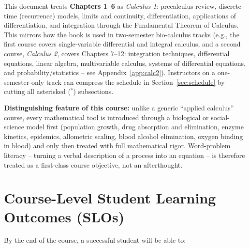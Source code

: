 \documentclass[11pt]{article}
\newcommand{\opt}{$^{\ast}$}
\begin{document}
This document treats \textbf{Chapters 1--6} as \emph{Calculus 1}: precalculus review,
discrete-time (recurrence) models, limits and continuity, differentiation, applications of
differentiation, and integration through the Fundamental Theorem of Calculus. This mirrors
how the book is used in two-semester bio-calculus tracks (e.g., the first course covers
single-variable differential and integral calculus, and a second course, \emph{Calculus 2},
covers Chapters 7--12: integration techniques, differential equations, linear algebra,
multivariable calculus, systems of differential equations, and probability/statistics --
see Appendix~\ref{app:calc2}). Instructors on a one-semester-only track can compress the
schedule in Section~\ref{sec:schedule} by cutting all asterisked (\opt) subsections.

\textbf{Distinguishing feature of this course:} unlike a generic ``applied calculus''
course, every mathematical tool is introduced through a biological or social-science model
first (population growth, drug absorption and elimination, enzyme kinetics, epidemics,
allometric scaling, blood alcohol elimination, oxygen binding in blood) and only then
treated with full mathematical rigor. Word-problem literacy -- turning a verbal description
of a process into an equation -- is therefore treated as a first-class course objective,
not an afterthought.

\section{Course-Level Student Learning Outcomes (SLOs)}

By the end of the course, a successful student will be able to:
\end{document}
